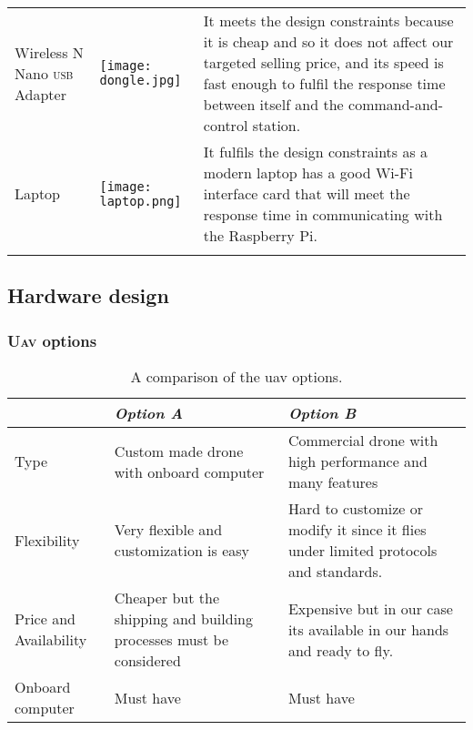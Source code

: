 \documentclass[../main.tex]{subfiles}
\begin{document}
\begin{table}[p]
\begin{tabular}{ p{4cm} p{3cm} p{6cm} }
		Wireless N Nano \textsc{usb} Adapter  
		& \begin{minipage}{.1\textwidth}
			\texttt{[image: dongle.jpg]}
		\end{minipage} 
                & It meets the design constraints because it is cheap
                and so it does not affect our targeted selling price,
                and its speed is fast enough to fulfil the response time
                between itself and the command-and-control station.  \\ 
		\addlinespace
		
		Laptop 
		& \begin{minipage}{.1\textwidth}
			\texttt{[image: laptop.png]}
		\end{minipage} 
                & It fulfils the design constraints as a modern laptop
                has a good Wi-Fi interface card that will meet the
                response time in communicating with the Raspberry Pi.
                \\ 
		\addlinespace
		
		\bottomrule
	\end{tabular}
\end{table}


\subsection{Hardware design}

\subsubsection{\textsc{Uav} options}

\begin{table}[tbp]
	\centering
	\caption{A comparison of the \gls{uav} options.}
	\label{tab:alt-solutions}
	\begin{tabularx}{\textwidth}{ p{4cm} X X }
		\toprule
		\textit{} & \textit{Option A} & \textit{Option B}\\ \midrule
		Type  & Custom made drone with onboard computer & 
		Commercial drone with high performance and many features    \\
		Flexibility & Very flexible and customization is easy & 
		Hard to customize or modify it since it flies under 
		limited protocols and standards. \\
		
		Price and Availability & Cheaper but the shipping and 
		building processes must be considered & Expensive but 
		in our case its available in our hands and ready to fly.   \\
		
		Onboard computer & Must have & Must have \\
		\bottomrule
	\end{tabularx}
\end{table} 
\end{document}
